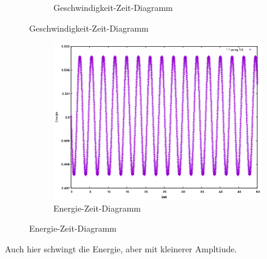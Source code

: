 \documentclass[
    oneside,
    ngerman,
    footinclude=false,
    captions=tableheading,
    DIV=12
]{scrartcl}
\begin{document}
\begin{figure}[H]
\begin{subfigure}[b]{0.45\textwidth}
                        \caption{Geschwindigkeit-Zeit-Diagramm}
                        \label{fig:expEulerA1(a)-001-0-v}
                    \end{subfigure}
                \end{figure}
                
                \begin{figure}[H]
                \centering
                \begin{subfigure}[b]{0.45\textwidth}
                    \centering
                    \includegraphics[width=\textwidth]{Bilddateien/expEulerA1(a)-001h-E.png}
                    \caption{Energie-Zeit-Diagramm}
                    \label{fig:expEulerA1(a)-001-0-E}
                \end{subfigure}
                \end{figure}
                Auch hier schwingt die Energie, aber mit kleinerer Ampltiude.
                \newpage
\end{document}
